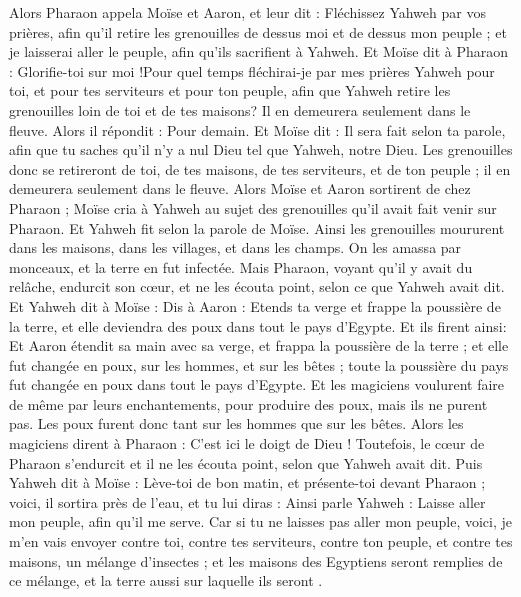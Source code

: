 \begin{multicols}{2}
Alors Pharaon appela Moïse et Aaron, et leur dit : Fléchissez Yahweh par vos prières, afin qu'il retire les grenouilles de dessus moi et de dessus mon peuple ; et je laisserai aller le peuple, afin qu'ils sacrifient à Yahweh.
 Et Moïse dit à Pharaon : Glorifie-toi sur moi !Pour quel temps fléchirai-je par mes prières Yahweh pour toi, et pour tes serviteurs et pour ton peuple, afin que Yahweh retire les grenouilles loin de toi et de tes maisons? Il en demeurera seulement dans le fleuve.
 Alors il répondit : Pour demain. Et Moïse dit : Il sera fait selon ta parole, afin que tu saches qu'il n'y a nul Dieu tel que Yahweh, notre Dieu.
Les grenouilles donc se retireront de toi, de tes maisons, de tes serviteurs, et de ton peuple ; il en demeurera seulement dans le fleuve.
Alors Moïse et Aaron sortirent de chez Pharaon ; Moïse cria à Yahweh au sujet des grenouilles qu'il avait fait venir sur Pharaon.
 Et Yahweh fit selon la parole de Moïse. Ainsi les grenouilles moururent dans les maisons, dans les villages, et dans les champs.
On les amassa par monceaux, et la terre en fut infectée.
Mais Pharaon, voyant qu'il y avait du relâche, endurcit son cœur, et ne les écouta point, selon ce que Yahweh avait dit.
Et Yahweh dit à Moïse : Dis à Aaron : Etends ta verge et frappe la poussière de la terre, et elle deviendra des poux dans tout le pays d'Egypte.
 Et ils firent ainsi: Et Aaron étendit sa main avec sa verge, et frappa la poussière de la terre ; et elle fut changée en poux, sur les hommes, et sur les bêtes ; toute la poussière du pays fut changée en poux dans tout le pays d'Egypte.
Et les magiciens voulurent faire de même par leurs enchantements, pour produire des poux, mais ils ne purent pas. Les poux furent donc tant sur les hommes que sur les bêtes.
Alors les magiciens dirent à Pharaon : C'est ici le doigt de Dieu ! Toutefois, le cœur de Pharaon s'endurcit et il ne les écouta point, selon que Yahweh avait dit.
Puis Yahweh dit à Moïse : Lève-toi de bon matin, et présente-toi devant Pharaon ; voici, il sortira près de l'eau, et tu lui diras : Ainsi parle Yahweh : Laisse aller mon peuple, afin qu'il me serve.
Car si tu ne laisses pas aller mon peuple, voici, je m'en vais envoyer contre toi, contre tes serviteurs, contre ton peuple, et contre tes maisons, un mélange d'insectes ; et les maisons des Egyptiens seront remplies de ce mélange, et la terre aussi sur laquelle ils seront .

\end{multicols}
